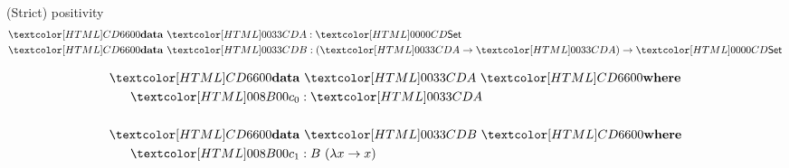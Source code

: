 \begin{frame}{(Strict) positivity}
  \begin{align*}
    &\data\ \Aty : \Set \\
    &\data\ \Bty : (\Aty \to \Aty) \to \Set
  \end{align*}

  \begin{align*}
    &\data\ \Aty\ \where \\
    &\ \ \ \ \ \Aco : \Aty \\
    \\
    &\data\ \Bty\ \where \\
    &\ \ \ \ \ \Bci : B\ (\lambda x \to x)
  \end{align*}
\end{frame}

